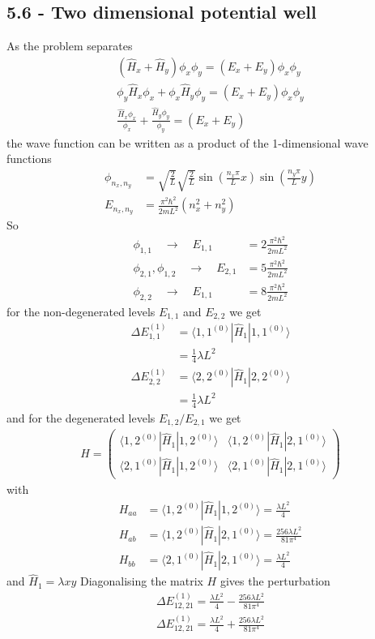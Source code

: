 \documentclass[10pt,a4paper]{book}
\theoremstyle{definition}
\begin{document}
\subsection{5.6 - Two dimensional potential well}
As the problem separates 
\begin{align}
\left(\hat{H}_x+\hat{H}_y\right)\phi_x\phi_y=(E_x+E_y)\phi_x\phi_y\\
\phi_y\hat{H}_x\phi_x+\phi_x\hat{H}_y\phi_y=(E_x+E_y)\phi_x\phi_y\\
\frac{\hat{H}_x\phi_x}{\phi_x}+\frac{\hat{H}_y\phi_y}{\phi_y}=(E_x+E_y)
\end{align}
the wave function can be written as a product of the 1-dimensional wave functions
\begin{align}
\phi_{n_x,n_y}&=\sqrt{\frac{2}{L}}\sqrt{\frac{2}{L}}\sin\left(\frac{n_x\pi}{L}x\right)\sin\left(\frac{n_y\pi}{L}y\right)\\
E_{n_x,n_y}&=\frac{\pi^2\hbar^2}{2mL^2}(n_x^2+n_y^2)
\end{align}
So 
\begin{align}
\phi_{1,1}\quad\rightarrow\quad E_{1,1}&=2\frac{\pi^2\hbar^2}{2mL^2}\\
\phi_{2,1},\phi_{1,2}\quad\rightarrow\quad E_{2,1}&=5\frac{\pi^2\hbar^2}{2mL^2}\\
\phi_{2,2}\quad\rightarrow\quad E_{1,1}&=8\frac{\pi^2\hbar^2}{2mL^2}
\end{align}
for the non-degenerated levels $E_{1,1}$ and $E_{2,2}$ we get
\begin{align}
\Delta E_{1,1}^{(1)}&=\langle 1,1^{(0)}|\hat{H}_1|1,1^{(0)}\rangle\\
&=\frac{1}{4}\lambda L^2\\
\Delta E_{2,2}^{(1)}&=\langle 2,2^{(0)}|\hat{H}_1|2,2^{(0)}\rangle\\
&=\frac{1}{4}\lambda L^2
\end{align}
and for the degenerated levels $E_{1,2}/E_{2,1}$ we get
\begin{align}
H=
\begin{pmatrix}
\langle 1,2^{(0)}|\hat{H}_1|1,2^{(0)}\rangle & \langle 1,2^{(0)}|\hat{H}_1|2,1^{(0)}\rangle\\
\langle 2,1^{(0)}|\hat{H}_1|1,2^{(0)}\rangle & \langle 2,1^{(0)}|\hat{H}_1|2,1^{(0)}\rangle
\end{pmatrix}
\end{align}
with
\begin{align}
H_{aa}&=\langle 1,2^{(0)}|\hat{H}_1|1,2^{(0)}\rangle=\frac{\lambda L^2}{4}\\
H_{ab}&=\langle 1,2^{(0)}|\hat{H}_1|2,1^{(0)}\rangle=\frac{256\lambda L^2}{81\pi^4}\\
H_{bb}&=\langle 2,1^{(0)}|\hat{H}_1|2,1^{(0)}\rangle=\frac{\lambda L^2}{4}
\end{align}
and $\hat{H}_1=\lambda x y$ Diagonalising the matrix $H$ gives the perturbation
\begin{align}
\Delta E_{12,21}^{(1)}=\frac{\lambda L^2}{4}-\frac{256\lambda L^2}{81\pi^4}\\
\Delta E_{12,21}^{(1)}=\frac{\lambda L^2}{4}+\frac{256\lambda L^2}{81\pi^4}\\
\end{align}
\end{document}
